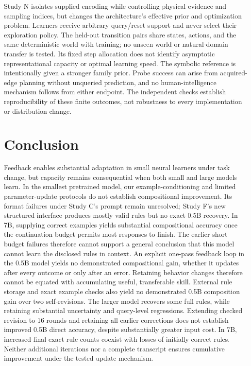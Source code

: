 \documentclass[11pt]{article}
\begin{document}
Study N isolates supplied encoding while controlling physical evidence and
sampling indices, but changes the architecture's effective prior and
optimization problem. Learners receive arbitrary query/reset support and
never select their exploration policy. The held-out transition pairs share
states, actions, and the same deterministic world with training; no unseen
world or natural-domain transfer is tested. Its fixed step allocation does
not identify asymptotic representational capacity or optimal learning speed.
The symbolic reference is intentionally given a stronger family prior. Probe
success can arise from acquired-edge planning without unqueried prediction,
and no human-intelligence mechanism follows from either endpoint. The
independent checks establish reproducibility of these finite outcomes, not
robustness to every implementation or distribution change.

\section{Conclusion}
Feedback enables substantial adaptation in small neural learners under task
change, but capacity remains consequential when both small and large models
learn. In the smallest pretrained model, our example-conditioning and limited
parameter-update protocols do not establish compositional improvement. Its
format failures under Study C's prompt remain unresolved; Study F's new
structured interface produces mostly valid rules but no exact 0.5B recovery.
In 7B, supplying correct examples yields
substantial compositional accuracy once the continuation budget permits most
responses to finish. The earlier short-budget failures therefore cannot support
a general conclusion that this model cannot learn the disclosed rules in context.
An explicit one-pass feedback loop in the 0.5B model yields no demonstrated
compositional gain, whether it updates after every outcome or only after an
error. Retaining behavior changes therefore cannot be equated with accumulating
useful, transferable skill. External rule storage and exact example checks
also yield no demonstrated 0.5B composition gain over two self-revisions.
The larger model recovers some full rules, while retaining substantial
uncertainty and query-level regressions. Extending checked revision to 16
rounds and retaining all earlier corrections does not establish improved
0.5B direct accuracy, despite substantially greater input cost. In 7B,
increased final exact-rule counts coexist with losses of initially correct
rules. Neither additional iterations nor a complete transcript ensures
cumulative improvement under the tested update mechanism.
\end{document}
